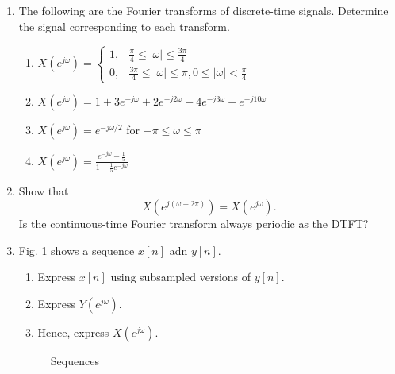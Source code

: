 \documentclass[11pt]{article}
\begin{document}
\begin{enumerate}
    \item The following are the Fourier transforms of discrete-time signals. Determine the signal corresponding to each transform.
	    \begin{enumerate}
	    	\item $X\left(e^{j\omega}\right) = \begin{cases}
	    	1, &\frac{\pi}{4} \leq |\omega| \leq \frac{3\pi}{4} \\ 0, & \frac{3\pi}{4} \leq |\omega| \leq \pi, 0 \leq |\omega| < \frac{\pi}{4} \end{cases}$
	    	\item $X\left(e^{j\omega}\right) = 1 + 3e^{-j\omega} + 2e^{-j2\omega} -4e^{-j3\omega} + e^{-j10\omega}$
	    	\item $X\left(e^{j\omega}\right) = e^{-j\omega/2}$ for $-\pi \leq \omega \leq \pi$
	    	\item $X\left(e^{j\omega}\right) = \frac{e^{-j\omega} - \frac{1}{5}}{1-\frac{1}{5}e^{-j\omega}}$	    	
	    \end{enumerate}

    \item Show that 
        \begin{equation*}
            X\left(e^{j(\omega + 2\pi)}\right) = X\left(e^{j\omega}\right).
        \end{equation*}
        Is the continuous-time Fourier transform always periodic as the DTFT?
    \item Fig. \ref{fi:example59} shows a sequence $x[n]$ adn $y[n]$. 
    \begin{enumerate}
    	\item Express $x[n]$ using subsampled versions of $y[n]$.
    	\item Express $Y\left(e^{j\omega}\right)$.
    	\item Hence, express $X\left(e^{j\omega}\right)$.    	
    \end{enumerate}
    



 	\begin{figure}
		
		\caption{Sequences}
		\label{fi:example59}
	\end{figure}


\end{enumerate}
\end{document}
